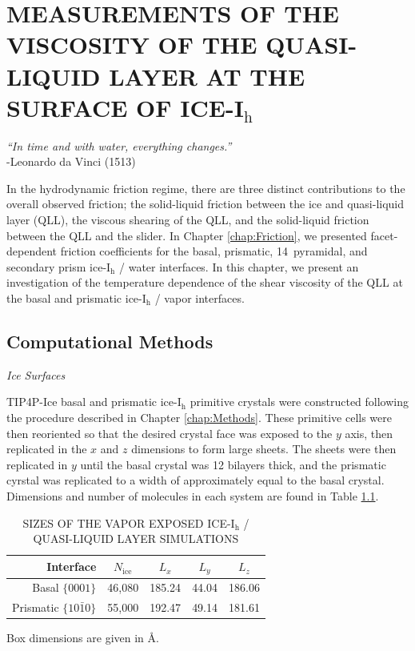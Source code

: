 \chapter{MEASUREMENTS OF THE VISCOSITY OF THE QUASI-LIQUID LAYER AT THE SURFACE OF ICE-I$_\mathrm{h}$}\label{chap:QLL}

\begin{flushright}
\textit{``In time and with water, everything changes.''} \\
-Leonardo da Vinci (1513) \\
\end{flushright}

In the hydrodynamic friction regime, there are three distinct
contributions to the overall observed friction; the solid-liquid
friction between the ice and quasi-liquid layer (QLL), the viscous
shearing of the QLL, and the solid-liquid friction between the QLL and
the slider.\cite{Kietzig2009,Kietzig2010} In Chapter
\ref{chap:Friction}, we presented facet-dependent friction
coefficients for the basal, prismatic, 14\degree~pyramidal, and
secondary prism ice-I$_\mathrm{h}$ / water interfaces. In this
chapter, we present an investigation of the temperature dependence of
the shear viscosity of the QLL at the basal and prismatic
ice-I$_\mathrm{h}$ / vapor interfaces.



\section{Computational Methods}

\begin{flushleft}
\textit{Ice Surfaces}
\end{flushleft}

TIP4P-Ice basal and prismatic ice-I$_\mathrm{h}$ primitive crystals
were constructed following the procedure described in Chapter
\ref{chap:Methods}. These primitive cells were then reoriented so that
the desired crystal face was exposed to the $y$ axis, then replicated
in the $x$ and $z$ dimensions to form large sheets. The sheets were
then replicated in $y$ until the basal crystal was 12 bilayers thick,
and the prismatic cyrstal was replicated to a width of approximately
equal to the basal crystal. Dimensions and number of molecules in each
system are found in Table \ref{tab:qll-method}.


\begin{table}[h]
\centering
\caption{SIZES OF THE VAPOR EXPOSED ICE-I$_\mathrm{h}$ / QUASI-LIQUID LAYER SIMULATIONS\label{tab:qll-method}}
\begin{tabular}{rcccc}
\hline
\hline
 Interface & $N_\mathrm{ice}$ & $L_x$ & $L_y$ & $L_z$ \\
\hline
Basal  $\{0001\}$                           & 46,080 & 185.24 & 44.04 & 186.06 \\
Prismatic  $\{10\bar{1}0\}$            & 55,000 & 192.47 & 49.14 & 181.61\\
\hline
\hline
\end{tabular}
\begin{flushleft}
Box dimensions are given in \AA.
\end{flushleft}
\end{table}


